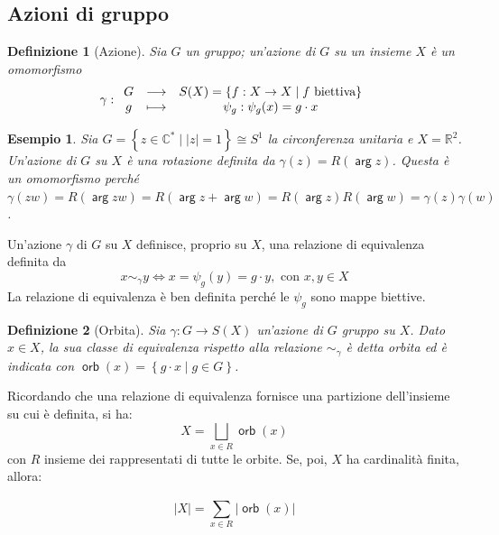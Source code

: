 \documentclass[11pt]{scrartcl}
\theoremstyle{style1}
\newtheorem{definizione}{Definizione}[section]
\newtheorem{esempio}{Esempio}[section]
\newenvironment{boxenv}[1][]{
    \begin{eqbox}[#1]
    }{
   \end{eqbox}
}
\numberwithin{equation}{subsection}
\renewcommand{\operatorname}[1]{\mathop{\mathrm{\textsf{#1}}}}
\begin{document}
\subsection{Azioni di gruppo}
\begin{definizione}
	[Azione]
	Sia $G$ un gruppo; un'azione di $G$ su un insieme $X$ \`e un omomorfismo
	\[
	\gamma : 
	\begin{array}
		{c c c}
		G &\longrightarrow & S(X) = \left\{ f : X \to X  \mid f \text{ biettiva} \right\} \\
		g & \longmapsto & \psi _g : \psi_g(x) = g \cdot x
	\end{array}
	\] 
\end{definizione}
\begin{esempio}
Sia $G = \left\{ z \in \mathbb{C}^*  \mid  \lvert z \rvert =1 \right\} \cong S^1$ la circonferenza unitaria e $X = \mathbb{R}^2$.
Un'azione di $G$ su $X$ \`e una rotazione definita da $\gamma(z) = R(\operatorname{arg} z)$.
Questa \`e un omomorfismo perch\'e $\gamma(zw) = R(\operatorname{arg} zw)  = R(\operatorname{arg} z +  \operatorname{arg} w) = R(\operatorname{arg} z) R(\operatorname{arg} w)= \gamma(z) \gamma(w)$.
\end{esempio}
\noindent Un'azione $\gamma$ di $G$ su $X$ definisce, proprio su $X$, una relazione di equivalenza definita da 
\begin{equation}
	x \sim _\gamma y \iff x=\psi _g(y)=g \cdot y, \text{ con } x,y \in X
\end{equation}
La relazione di equivalenza \`e ben definita perch\'e le $\psi _g$ sono mappe biettive.
\begin{definizione}
	[Orbita]
	Sia $\gamma :G \to S(X)$ un'azione di $G$ gruppo su $X$. Dato $x \in X$, la sua classe di equivalenza rispetto alla relazione $\sim _\gamma$ \`e detta \textit{orbita} ed \`e indicata con $\operatorname{orb} (x) = \left\{ g \cdot  x  \mid g \in G\right\} $.
\end{definizione}
\noindent Ricordando che una relazione di equivalenza fornisce una partizione dell'insieme su cui \`e definita, si ha:
\begin{equation}
	X = \bigsqcup_{x \in R} \operatorname{orb} (x)
\end{equation}
con $R$ insieme dei rappresentati di tutte le orbite.
Se, poi, $X$ ha cardinalit\`a finita, allora:
\begin{boxenv}[]
\begin{equation}
	\lvert X \rvert  = \sum_{x \in R}^{} \lvert \operatorname{orb} (x) \rvert 
\end{equation}
\end{boxenv}
\end{document}
